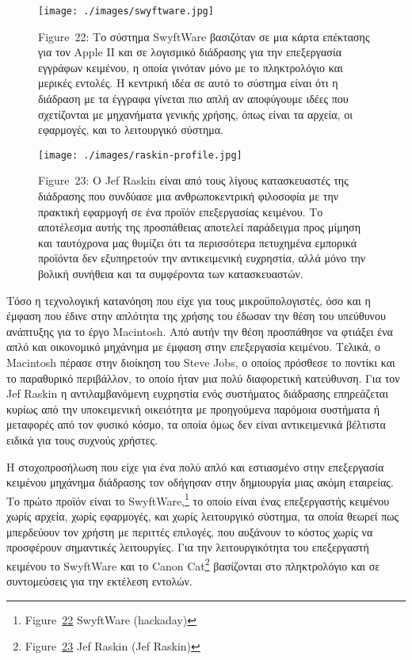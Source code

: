 \documentclass[
]{article}
\begin{document}
\leavevmode{}%
\begin{figure}
\hypertarget{fig:swyftware}{%
\centering
\texttt{[image: ./images/swyftware.jpg]}
\caption{Figure~22: Το σύστημα SwyftWare βασιζόταν σε μια κάρτα
επέκτασης για τον Apple II και σε λογισμικό διάδρασης για την
επεξεργασία εγγράφων κειμένου, η οποία γινόταν μόνο με το πληκτρολόγιο
και μερικές εντολές. Η κεντρική ιδέα σε αυτό το σύστημα είναι ότι η
διάδραση με τα έγγραφα γίνεται πιο απλή αν αποφύγουμε ιδέες που
σχετίζονται με μηχανήματα γενικής χρήσης, όπως είναι τα αρχεία, οι
εφαρμογές, και το λειτουργικό σύστημα.}\label{fig:swyftware}
}
\end{figure}

\leavevmode{}%
\begin{figure}
\hypertarget{fig:raskin-profile}{%
\centering
\texttt{[image: ./images/raskin-profile.jpg]}
\caption{Figure~23: Ο Jef Raskin είναι από τους λίγους κατασκευαστές της
διάδρασης που συνδύασε μια ανθρωποκεντρική φιλοσοφία με την πρακτική
εφαρμογή σε ένα προϊόν επεξεργασίας κειμένου. Το αποτέλεσμα αυτής της
προσπάθειας αποτελεί παράδειγμα προς μίμηση και ταυτόχρονα μας θυμίζει
ότι τα περισσότερα πετυχημένα εμπορικά προϊόντα δεν εξυπηρετούν την
αντικειμενική ευχρηστία, αλλά μόνο την βολική συνήθεια και τα συμφέροντα
των κατασκευαστών.}\label{fig:raskin-profile}
}
\end{figure}

Τόσο η τεχνολογική κατανόηση που είχε για τους μικροϋπολογιστές, όσο και
η έμφαση που έδινε στην απλότητα της χρήσης του έδωσαν την θέση του
υπεύθυνου ανάπτυξης για το έργο Macintosh. Από αυτήν την θέση προσπάθησε
να φτιάξει ένα απλό και οικονομικό μηχάνημα με έμφαση στην επεξεργασία
κειμένου. Τελικά, ο Macintosh πέρασε στην διοίκηση του Steve Jobs, ο
οποίος πρόσθεσε το ποντίκι και το παραθυρικό περιβάλλον, το οποίο ήταν
μια πολύ διαφορετική κατεύθυνση. Για τον Jef Raskin η αντιλαμβανόμενη
ευχρηστία ενός συστήματος διάδρασης επηρεάζεται κυρίως από την
υποκειμενική οικειότητα με προηγούμενα παρόμοια συστήματα ή μεταφορές
από τον φυσικό κόσμο, τα οποία όμως δεν είναι αντικειμενικά βέλτιστα
ειδικά για τους συχνούς χρήστες.

Η στοχοπροσήλωση που είχε για ένα πολύ απλό και εστιασμένο στην
επεξεργασία κειμένου μηχάνημα διάδρασης τον οδήγησαν στην δημιουργία
μιας ακόμη εταιρείας. Το πρώτο προϊόν είναι το SwyftWare,\footnote{Figure~\protect\hyperlink{fig:swyftware}{22}
  SwyftWare (hackaday)} το οποίο είναι ένας επεξεργαστής κειμένου χωρίς
αρχεία, χωρίς εφαρμογές, και χωρίς λειτουργικό σύστημα, τα οποία θεωρεί
πως μπερδεύουν τον χρήστη με περιττές επιλογές, που αυξάνουν το κόστος
χωρίς να προσφέρουν σημαντικές λειτουργίες. Για την λειτουργικότητα του
επεξεργαστή κειμένου το SwyftWare και το Canon Cat\footnote{Figure~\protect\hyperlink{fig:raskin-profile}{23}
  Jef Raskin (Jef Raskin)} βασίζονται στο πληκτρολόγιο και σε
συντομεύσεις για την εκτέλεση εντολών.
\end{document}
